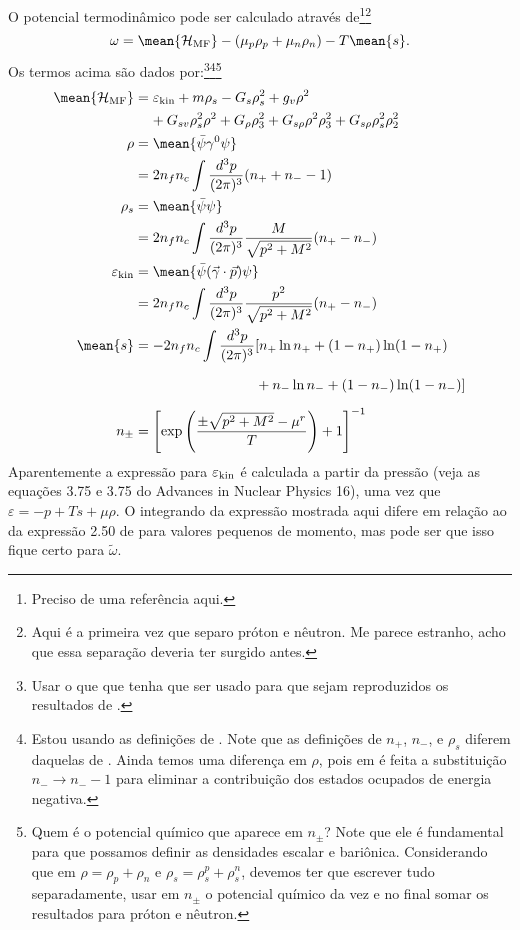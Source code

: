 O potencial termodinâmico pode ser calculado através de\footnote{Preciso de uma referência aqui.}\footnote{Aqui é a primeira vez que separo próton e nêutron. Me parece estranho, acho que essa separação deveria ter surgido antes.}
\begin{equation}
    \omega = \mean{\mathcal{H}_{\rm{MF}}} - (\mu_p \rho_p + \mu_n\rho_n) - T\mean{s}.
\end{equation}
%
Os termos acima são dados por:\footnote{Usar o que que tenha que ser usado para que sejam reproduzidos os resultados de \cite{Pais}.}\footnote{Estou usando as definições de \cite{japoneses2}. Note que as definições de $n_{+}$, $n_{-}$, e $\rho_s$ diferem daquelas de \cite{Buballa}. Ainda temos uma diferença em $\rho$, pois em \cite{japoneses2} é feita a substituição $n_{-} \to n_{-} - 1$ para eliminar a contribuição dos estados ocupados de energia negativa.}\footnote{Quem é o potencial químico que aparece em $n_{\pm}$? Note que ele é fundamental para que possamos definir as densidades escalar e bariônica. Considerando que em \cite{Pais} $\rho = \rho_p + \rho_n$ e $\rho_s = \rho_s^p + \rho_s^n$, devemos ter que escrever tudo separadamente, usar em $n_{\pm}$ o potencial químico da vez e no final somar os resultados para próton e nêutron.}
\begin{align}
    \mean{\mathcal{H}_{\rm{MF}}} &= \varepsilon_{\rm{kin}} + m \rho_s - G_s \rho_s^2 + g_v\rho^2 \nonumber \\
    &\phantom{=}~ + G_{sv}\rho_s^2\rho^2 + G_\rho\rho_3^2 + G_{s\rho}\rho^2\rho_3^2 + G_{s\rho}\rho_s^2\rho_2^2 \\
    \rho &= \mean{\bar\psi\gamma^0\psi} \nonumber \\
    &= 2n_fn_c\int\frac{d^3p}{(2\pi)^3} (n_{+} + n_{-} - 1) \\
    \rho_s &= \mean{\bar\psi\psi} \nonumber \\
    &= 2n_fn_c\int\frac{d^3p}{(2\pi)^3} \frac{M}{\sqrt{p^2 + M^2}} (n_{+} - n_{-})\\
    \varepsilon_{\rm{kin}} &= \mean{\bar\psi(\vec{\gamma}\cdot\vec{p})\psi} \nonumber \\
    &= 2n_fn_c\int\frac{d^3p}{(2\pi)^3} \frac{p^2}{\sqrt{p^2 + M^2}} (n_{+} - n_{-})\\
    \mean{s} &= -2n_fn_c \int \frac{d^3p}{(2\pi)^3} [ n_{+}\ln n_{+} + (1 - n_{+})\ln(1-n_{+}) \nonumber \\
    &\phantom{=-2n_fn_c \int \frac{d^3p}{(2\pi)^3} [}+ n_{-}\ln n_{-} + (1- n_{-})\ln(1-n_{-})] \\
    n_{\pm} &= \left[\exp\left(\frac{\pm\sqrt{p^2+M^2} - \mu^r}{T}\right) + 1\right]^{-1}
\end{align}
%
Aparentemente a expressão para $\varepsilon_{\rm{kin}}$ é calculada a partir da pressão (veja as equações 3.75 e 3.75 do Advances in Nuclear Physics 16), uma vez que $\varepsilon = -p + Ts + \mu\rho$. O integrando da expressão mostrada aqui difere em relação ao da expressão 2.50 de \cite{Buballa} para valores pequenos de momento, mas pode ser que isso fique certo para $\tilde\omega$.

